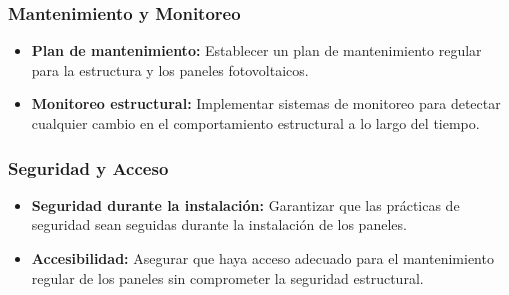\documentclass{article}
\newcommand{\path}{../../assets/settings}
\begin{document}
\subsubsection*{Mantenimiento y Monitoreo}
\begin{itemize}
    \item \textbf{Plan de mantenimiento:} Establecer un plan de mantenimiento regular para la estructura y los paneles fotovoltaicos.
    \item \textbf{Monitoreo estructural:} Implementar\cite{idaepctcon} sistemas de monitoreo para detectar cualquier cambio en el comportamiento estructural a lo largo del tiempo.
\end{itemize}

\subsubsection*{Seguridad y Acceso}
\begin{itemize}
    \item \textbf{Seguridad durante la instalación:} Garantizar que las prácticas de seguridad sean seguidas durante la instalación de los paneles.
    \item \textbf{Accesibilidad:} Asegurar que haya acceso adecuado para el mantenimiento regular de los paneles sin comprometer la seguridad estructural.
\end{itemize}



\ifdefined{} %
\else


\fi
\end{document}
